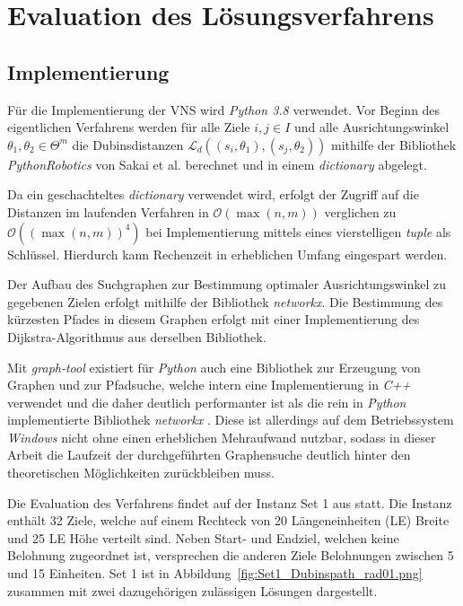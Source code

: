 \documentclass[12pt,a4paper,twoside]{article}
\theoremstyle{definition}
\numberwithin{equation}{section}
\begin{document}
\newpage

\section{Evaluation des Lösungsverfahrens}\label{section:evaluation}
\subsection{Implementierung}\label{subsection:implementation}
Für die Implementierung der VNS wird \textit{Python 3.8} verwendet. Vor Beginn des eigentlichen Verfahrens werden für alle Ziele $i,j \in I$ und alle Ausrichtungswinkel $\theta_1,\theta_2 \in \Theta^m$ die Dubinsdistanzen $\mathcal{L}_d((s_i,\theta_1),(s_j,\theta_2))$ mithilfe der Bibliothek \textit{PythonRobotics} von Sakai et al. \cite{AtsushiSakai.2018} berechnet und in einem \textit{dictionary} abgelegt. 

Da ein geschachteltes \textit{dictionary} verwendet wird, erfolgt der Zugriff auf die Distanzen im laufenden Verfahren in $\mathcal{O}(\max(n,m))$ verglichen zu $\mathcal{O}((\max(n,m))^4)$ bei Implementierung mittels eines vierstelligen \textit{tuple} als Schlüssel. Hierdurch kann Rechenzeit in erheblichen Umfang eingespart werden.

Der Aufbau des Suchgraphen zur Bestimmung optimaler Ausrichtungswinkel zu gegebenen Zielen erfolgt mithilfe der Bibliothek \textit{networkx}. Die Bestimmung des kürzesten Pfades in diesem Graphen erfolgt mit einer Implementierung des Dijkstra-Algorithmus aus derselben Bibliothek.

Mit \textit{graph-tool} existiert für \textit{Python} auch eine Bibliothek zur Erzeugung von Graphen und zur Pfadsuche, welche intern eine Implementierung in \textit{C++} verwendet und die daher deutlich performanter ist als die rein in \textit{Python} implementierte Bibliothek \textit{networkx} \cite{Peixoto.2022}. Diese ist allerdings auf dem Betriebssystem \textit{Windows} nicht ohne einen erheblichen Mehraufwand nutzbar, sodass in dieser Arbeit die Laufzeit der durchgeführten Graphensuche deutlich hinter den theoretischen Möglichkeiten zurückbleiben muss.

Die Evaluation des Verfahrens findet auf der Instanz Set 1 aus \cite{Tsiligirides.1984} statt. Die Instanz enthält 32 Ziele, welche auf einem Rechteck von 20 Längeneinheiten (LE) Breite und 25 LE Höhe verteilt sind. Neben Start- und Endziel, welchen keine Belohnung zugeordnet ist, versprechen die anderen Ziele Belohnungen zwischen 5 und 15 Einheiten.
Set 1 ist in Abbildung~\ref{fig:Set1_Dubinspath_rad01.png} zusammen mit zwei dazugehörigen zulässigen Lösungen dargestellt.
\end{document}
